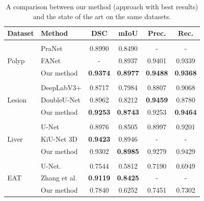 \begin{table}[t]
\centering
\def\arraystretch{1.2}
\begin{tabularx}{\textwidth}{X X c c c c} 
 \textbf{Dataset} & \textbf{Method} & \textbf{DSC} & \textbf{mIoU} & \textbf{Prec.} & \textbf{Rec.} \\ 
 \hline \\ [-1.5ex]
 
 \multirow{3}{1em}{{Polyp}}
& PraNet \cite{fanPraNetParallelReverse2020} & 0.8990 & 0.8490 & - & - \\
& FANet \cite{tomarFANetFeedbackAttention2021a} & - & 0.8937 & 0.9401 & 0.9339 \\
& Our method & \textbf{0.9374} & \textbf{0.8977} & \textbf{0.9488} &  \textbf{0.9368} \\ [1ex]
\hline \\ [-1.5ex]

 \multirow{3}{1em}{{Lesion}}
& DeepLabV3+ \cite{chenEncoderDecoderAtrousSeparable2018} & 0.8717 & 0.7984 & 0.8807 & 0.9068 \\
& DoubleU-Net \cite{jhaDoubleUNetDeepConvolutional2020} & 0.8962 & 0.8212 & \textbf{0.9459} & 0.8780 \\
& Our method & \textbf{0.9253} & \textbf{0.8743} & 0.9253 &  \textbf{0.9464} \\ [1ex]
\hline \\ [-1.5ex]

 \multirow{3}{1em}{{Liver}}
& U-Net \cite{ronnebergerUNetConvolutionalNetworks2015} & 0.8976 & 0.8505 & 0.8997 & 0.9201 \\
& KiU-Net 3D \cite{valanarasuKiUNetOvercompleteConvolutional2020a} & \textbf{0.9423} & 0.8946 & - & - \\
& Our method & 0.9302 & \textbf{0.8985} & 0.9279 & 0.9429 \\ [1ex]
\hline \\ [-1.5ex]

 \multirow{3}{1em}{{EAT}}
& U-Net. \cite{ronnebergerUNetConvolutionalNetworks2015} & 0.7544 & 0.5812 & 0.7190 & 0.6949 \\
& Zhang et al. \cite{zhangAutomaticEpicardialFat2020a} & \textbf{0.9119} & \textbf{0.8425} & - & - \\
& Our method & 0.7840 & 0.6252 & 0.7451 &  0.7302 \\ [1ex]
\end{tabularx}
\caption{A comparison between our method (approach with best results) and the state of the art on the same datasets.}
\label{table:comparison}
\end{table}

